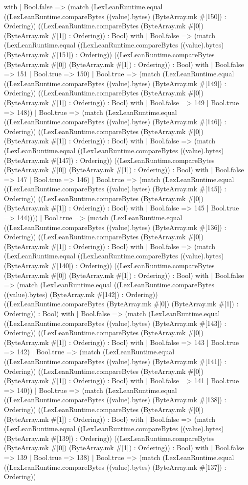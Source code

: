 \documentclass[11pt]{article}
\begin{document}
with | Bool.false => (match (LexLeanRuntime.equal ((LexLeanRuntime.compareBytes ((value).bytes) (ByteArray.mk \#[150]) : Ordering)) ((LexLeanRuntime.compareBytes (ByteArray.mk \#[0]) (ByteArray.mk \#[1]) : Ordering)) : Bool) with | Bool.false => (match (LexLeanRuntime.equal ((LexLeanRuntime.compareBytes ((value).bytes) (ByteArray.mk \#[151]) : Ordering)) ((LexLeanRuntime.compareBytes (ByteArray.mk \#[0]) (ByteArray.mk \#[1]) : Ordering)) : Bool) with | Bool.false => 151 | Bool.true => 150) | Bool.true => (match (LexLeanRuntime.equal ((LexLeanRuntime.compareBytes ((value).bytes) (ByteArray.mk \#[149]) : Ordering)) ((LexLeanRuntime.compareBytes (ByteArray.mk \#[0]) (ByteArray.mk \#[1]) : Ordering)) : Bool) with | Bool.false => 149 | Bool.true => 148)) | Bool.true => (match (LexLeanRuntime.equal ((LexLeanRuntime.compareBytes ((value).bytes) (ByteArray.mk \#[146]) : Ordering)) ((LexLeanRuntime.compareBytes (ByteArray.mk \#[0]) (ByteArray.mk \#[1]) : Ordering)) : Bool) with | Bool.false => (match (LexLeanRuntime.equal ((LexLeanRuntime.compareBytes ((value).bytes) (ByteArray.mk \#[147]) : Ordering)) ((LexLeanRuntime.compareBytes (ByteArray.mk \#[0]) (ByteArray.mk \#[1]) : Ordering)) : Bool) with | Bool.false => 147 | Bool.true => 146) | Bool.true => (match (LexLeanRuntime.equal ((LexLeanRuntime.compareBytes ((value).bytes) (ByteArray.mk \#[145]) : Ordering)) ((LexLeanRuntime.compareBytes (ByteArray.mk \#[0]) (ByteArray.mk \#[1]) : Ordering)) : Bool) with | Bool.false => 145 | Bool.true => 144)))) | Bool.true => (match (LexLeanRuntime.equal ((LexLeanRuntime.compareBytes ((value).bytes) (ByteArray.mk \#[136]) : Ordering)) ((LexLeanRuntime.compareBytes (ByteArray.mk \#[0]) (ByteArray.mk \#[1]) : Ordering)) : Bool) with | Bool.false => (match (LexLeanRuntime.equal ((LexLeanRuntime.compareBytes ((value).bytes) (ByteArray.mk \#[140]) : Ordering)) ((LexLeanRuntime.compareBytes (ByteArray.mk \#[0]) (ByteArray.mk \#[1]) : Ordering)) : Bool) with | Bool.false => (match (LexLeanRuntime.equal ((LexLeanRuntime.compareBytes ((value).bytes) (ByteArray.mk \#[142]) : Ordering)) ((LexLeanRuntime.compareBytes (ByteArray.mk \#[0]) (ByteArray.mk \#[1]) : Ordering)) : Bool) with | Bool.false => (match (LexLeanRuntime.equal ((LexLeanRuntime.compareBytes ((value).bytes) (ByteArray.mk \#[143]) : Ordering)) ((LexLeanRuntime.compareBytes (ByteArray.mk \#[0]) (ByteArray.mk \#[1]) : Ordering)) : Bool) with | Bool.false => 143 | Bool.true => 142) | Bool.true => (match (LexLeanRuntime.equal ((LexLeanRuntime.compareBytes ((value).bytes) (ByteArray.mk \#[141]) : Ordering)) ((LexLeanRuntime.compareBytes (ByteArray.mk \#[0]) (ByteArray.mk \#[1]) : Ordering)) : Bool) with | Bool.false => 141 | Bool.true => 140)) | Bool.true => (match (LexLeanRuntime.equal ((LexLeanRuntime.compareBytes ((value).bytes) (ByteArray.mk \#[138]) : Ordering)) ((LexLeanRuntime.compareBytes (ByteArray.mk \#[0]) (ByteArray.mk \#[1]) : Ordering)) : Bool) with | Bool.false => (match (LexLeanRuntime.equal ((LexLeanRuntime.compareBytes ((value).bytes) (ByteArray.mk \#[139]) : Ordering)) ((LexLeanRuntime.compareBytes (ByteArray.mk \#[0]) (ByteArray.mk \#[1]) : Ordering)) : Bool) with | Bool.false => 139 | Bool.true => 138) | Bool.true => (match (LexLeanRuntime.equal ((LexLeanRuntime.compareBytes ((value).bytes) (ByteArray.mk \#[137]) : Ordering)) 
\end{document}
